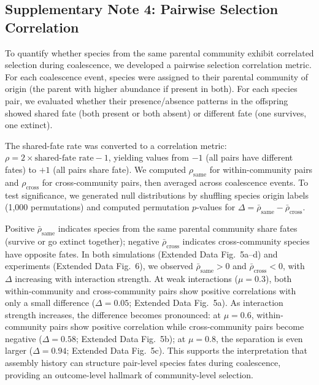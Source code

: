 \subsection*{Supplementary Note 4: Pairwise Selection Correlation}
\label{sec:suppl:note4}

To quantify whether species from the same parental community exhibit correlated selection during coalescence, we developed a pairwise selection correlation metric. For each coalescence event, species were assigned to their parental community of origin (the parent with higher abundance if present in both). For each species pair, we evaluated whether their presence/absence patterns in the offspring showed shared fate (both present or both absent) or different fate (one survives, one extinct).

The shared-fate rate was converted to a correlation metric: $\rho = 2 \times \text{shared-fate rate} - 1$, yielding values from $-1$ (all pairs have different fates) to $+1$ (all pairs share fate). We computed $\rho_{\text{same}}$ for within-community pairs and $\rho_{\text{cross}}$ for cross-community pairs, then averaged across coalescence events. To test significance, we generated null distributions by shuffling species origin labels (1,000 permutations) and computed permutation $p$-values for $\Delta = \bar{\rho}_{\text{same}} - \bar{\rho}_{\text{cross}}$.

Positive $\bar{\rho}_{\text{same}}$ indicates species from the same parental community share fates (survive or go extinct together); negative $\bar{\rho}_{\text{cross}}$ indicates cross-community species have opposite fates. In both simulations (Extended Data Fig.~5a--d) and experiments (Extended Data Fig.~6), we observed $\bar{\rho}_{\text{same}} > 0$ and $\bar{\rho}_{\text{cross}} < 0$, with $\Delta$ increasing with interaction strength. At weak interactions ($\mu = 0.3$), both within-community and cross-community pairs show positive correlations with only a small difference ($\Delta = 0.05$; Extended Data Fig.~5a). As interaction strength increases, the difference becomes pronounced: at $\mu = 0.6$, within-community pairs show positive correlation while cross-community pairs become negative ($\Delta = 0.58$; Extended Data Fig.~5b); at $\mu = 0.8$, the separation is even larger ($\Delta = 0.94$; Extended Data Fig.~5c). This supports the interpretation that assembly history can structure pair-level species fates during coalescence, providing an outcome-level hallmark of community-level selection.
